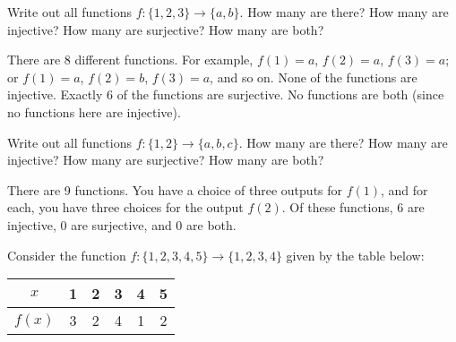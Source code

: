 \begin{questions}


\question Write out all functions $f: \{1,2,3\} \to \{a,b\}$.  How many are there?  How many are injective?  How many are surjective?  How many are both?

	\begin{answer}
	There are 8 different functions.  For example, $f(1) = a$, $f(2) = a$, $f(3) = a$; or $f(1) = a$, $f(2) = b$, $f(3) = a$, and so on.  None of the functions are injective.  Exactly 6 of the functions are surjective.  No functions are both (since no functions here are injective).
	\end{answer}




\question Write out all functions $f: \{1,2\} \to \{a,b,c\}$.  How many are there?  How many are injective?  How many are surjective?  How many are both?

	\begin{answer}
	There are 9 functions.  You have a choice of three outputs for $f(1)$, and for each, you have three choices for the output $f(2)$.  Of these functions, 6 are injective, 0 are surjective, and 0 are both.
	\end{answer}




\question Consider the function $f:\{1,2,3,4,5\} \to \{1,2,3,4\}$ given by the table below:

\begin{center}
\begin{tabular}{c||c|c|c|c|c}
              $x$ & 1 & 2 & 3 & 4 & 5 \\ \hline
              $f(x)$ & 3 & 2 & 4 & 1 & 2
            \end{tabular}
\end{center}


	\begin{answer}
\end{answer}
\end{questions}

